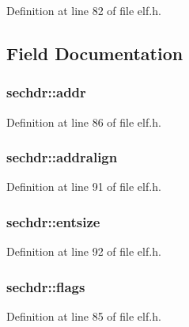 \-Definition at line 82 of file elf.\-h.



\subsection{\-Field \-Documentation}
\hypertarget{structsechdr_a01177bf70246483a03dd953d971e621d}{
\subsubsection[{addr}]{ {\bf sechdr\-::addr}}}\label{structsechdr_a01177bf70246483a03dd953d971e621d}


\-Definition at line 86 of file elf.\-h.

\hypertarget{structsechdr_acdef3f9bcf67524fb76a103170433b1f}{
\subsubsection[{addralign}]{ {\bf sechdr\-::addralign}}}\label{structsechdr_acdef3f9bcf67524fb76a103170433b1f}


\-Definition at line 91 of file elf.\-h.

\hypertarget{structsechdr_a68da29aef9f7b87f533b229abbaef452}{
\subsubsection[{entsize}]{ {\bf sechdr\-::entsize}}}\label{structsechdr_a68da29aef9f7b87f533b229abbaef452}


\-Definition at line 92 of file elf.\-h.

\hypertarget{structsechdr_ad421a758659fa74ebff5f6ff3bca7a94}{
\subsubsection[{flags}]{ {\bf sechdr\-::flags}}}\label{structsechdr_ad421a758659fa74ebff5f6ff3bca7a94}


\-Definition at line 85 of file elf.\-h.

